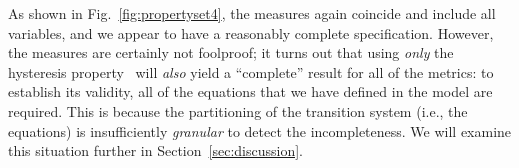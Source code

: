As shown in Fig.~\ref{fig:propertyset4}, the measures again coincide and include all variables, and we appear to have a reasonably complete specification.  However, the measures are certainly not foolproof; it turns out that using {\em only} the hysteresis property \hystp\ will {\em also} yield a ``complete'' result for all of the metrics: to establish its validity, all of the equations that we have defined in the model are required.  This is because the partitioning of the transition system (i.e., the equations) is insufficiently {\em granular} to detect the incompleteness.
We will examine this situation further in Section~\ref{sec:discussion}.
%
